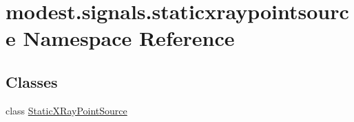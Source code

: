 \hypertarget{namespacemodest_1_1signals_1_1staticxraypointsource}{}\section{modest.\+signals.\+staticxraypointsource Namespace Reference}
\label{namespacemodest_1_1signals_1_1staticxraypointsource}
\subsection*{Classes}
\begin{DoxyCompactItemize}
\item 
class \hyperlink{classmodest_1_1signals_1_1staticxraypointsource_1_1StaticXRayPointSource}{Static\+X\+Ray\+Point\+Source}
\end{DoxyCompactItemize}
